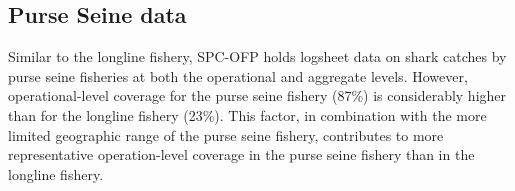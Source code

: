 \documentclass[12pt]{SCreport}
\begin{document}
\begin{comment}

Comprehensive data on shark catches at high spatial resolution are available from observer data held by the SPC-OFP but, as described above, the overall coverage of these data is low, and less than the required levels of  ROP  coverage. In addition, a comparison of longline effort  
and longline observer coverage
reveals that the latter is disproportional by region and flag and thus cannot be considered representative of the fishery as whole. 


Another aspect of the low data coverage problem is that a temporal representativeness on a month/year basis of the  the observed effort 
A comparison of the  annual  proportion observed by month - on a regional basis - shows significant fluctuations in the relative coverage of the observer data compared to the logbook data %
\end{comment}



\clearpage
 
 
 \subsection{Purse Seine data} 
Similar to the longline fishery, SPC-OFP holds logsheet data on shark catches by purse seine fisheries at both the operational and aggregate levels.  However, operational-level coverage for the purse seine fishery (87\%) is considerably higher than for the longline fishery (23\%). This factor, in combination with the more limited geographic range of the purse seine fishery, contributes to more representative operation-level coverage in the purse seine fishery than in the longline fishery.
\end{document}
